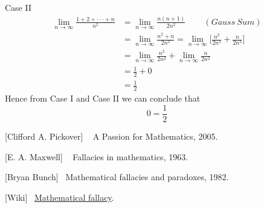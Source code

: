 \documentclass[paper=a4, fontsize=12pt]{scrartcl} %
\theoremstyle{definition}
\theoremstyle{remark}
\begin{document}
Case II
\begin{align*}
 \lim_{n\rightarrow \infty}\frac{1+2+\cdot\cdot\cdot+n}{n^2} & = \lim_{n\rightarrow \infty}\frac{n(n+1)}{2n^2}\,\qquad (Gauss~Sum) \\
                  & = \lim_{n\rightarrow \infty}\frac{n^2+n}{2n^2}=\lim_{n\rightarrow \infty}\biggl[\frac{n^2}{2n^2}+\frac{n}{2n^2}\biggl] \, \\
               & =\lim_{n\rightarrow \infty} \frac{n^2}{2n^2}+\lim_{n\rightarrow \infty}\frac{n}{2n^2} \, \\
               & = \frac{1}{2}+0 \, \\
               & = \frac{1}{2} \,
\end{align*}
Hence from Case I and Case II we can conclude that
$$0=\frac{1}{2}$$
\newpage
\begin{thebibliography}{9}

[Clifford A. Pickover] ~
A Passion for
Mathematics, 2005.

[E. A. Maxwell] ~
Fallacies in mathematics, 1963.

[Bryan Bunch]~
Mathematical fallacies and paradoxes, 1982.

[Wiki]~
\href{http://www.wikipedia.org}{Mathematical fallacy}.

\end{thebibliography}
\end{document}
